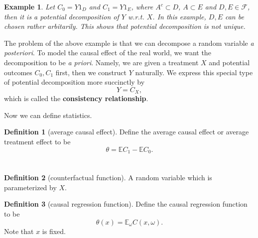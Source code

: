 \documentclass{article}
\newtheorem{example}{Example}[section]
\theoremstyle{definition}
\newtheorem{definition}{Definition}[section]
\begin{document}
\begin{example}
    Let $C_0=Y1_{D}$ and $C_1=Y1_E$, where $A^c\subset D$, $A\subset E$ and $D,E\in\mathcal{F}$, then it is a potential decomposition of $Y$ w.r.t. $X$. 
    In this example, $D,E$ can be chosen rather arbitarily. This shows that potential decomposition is not unique.
\end{example}
The problem of the above example is that we can decompose a random variable \textit{a posteriori}. 
To model the causal effect of the real world, we want the decomposition to be \textit{a priori}.
Namely, we are given a treatment $X$ and potential outcomes $C_0,C_1$ first, then we construct $Y$ naturally. 
We express this special type of potential decomposition more succinctly by
\begin{equation}
    Y=C_X,
\end{equation}
which is called the \textbf{consistency relationship}.


Now we can define statistics.

\begin{definition}[average causal effect]
    Define the average causal effect or average treatment effect to be
    \begin{equation}
        \theta=\mathbb{E}C_1-\mathbb{E}C_0.
    \end{equation}
\end{definition}

\section{}
\begin{definition}[counterfactual function]
    A random variable which is parameterized by $X$.
\end{definition}

\begin{definition}[causal regression function]
    Define the causal regression function to be 
    \begin{equation}
        \theta(x)=\mathbb{E}_\omega C(x,\omega).
    \end{equation}
    Note that $x$ is fixed.
\end{definition}
\end{document}
